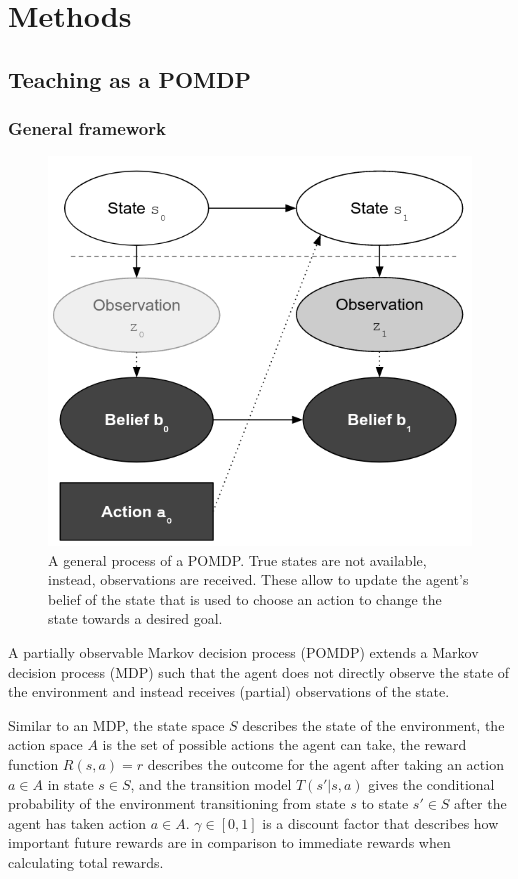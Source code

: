 
\section{Methods}

\subsection{Teaching as a POMDP}

\subsubsection{General framework}

\begin{figure}
    \centering
    \includegraphics[width=0.5\linewidth]{figures/pomdp-state.png}
    \caption{A general process of a POMDP. True states are not available, instead, observations are received. These allow to update the agent's belief of the state that is used to choose an action to change the state towards a desired goal.}
    \label{fig:pomdp}
\end{figure}

A partially observable Markov decision process (POMDP) extends a Markov decision process (MDP) such that the agent does not directly observe the state of the environment and instead receives (partial) observations of the state.

Similar to an MDP, the state space $S$ describes the state of the environment, the action space $A$ is the set of possible actions the agent can take, the reward function $R(s, a)=r$ describes the outcome for the agent after taking an action $a \in A$ in state $s \in S$, and the transition model $T(s'|s,a)$ gives the conditional probability of the environment transitioning from state $s$ to state $s' \in S$ after the agent has taken action $a \in A$.
$\gamma \in [0,1]$ is a discount factor that describes how important future rewards are in comparison to immediate rewards when calculating total rewards.

